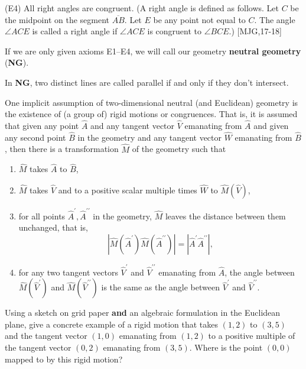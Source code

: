 \begin{axiom}
(E4) All right angles are congruent. (A right angle is defined as
follows. Let $C$ be the midpoint on the segment $\overline{AB}$. Let
$E$ be any point not equal to $C$. The angle $\angle ACE$ is called a
right angle if $\angle ACE$ is congruent to $\angle BCE$.) [MJG,17-18]
\end{axiom}

\begin{definition}
If we are only given axioms E1--E4, we will call our
geometry \textbf{neutral geometry} (\textbf{NG}).
\end{definition}

\begin{definition}
In \textbf{NG}, two distinct lines are called parallel if and only if they
don't intersect.
\end{definition}

One implicit assumption of two-dimensional neutral (and Euclidean)
geometry is the existence of (a group of) rigid motions or
congruences. That is, it is assumed that given any point $\hat{A}$ and
any tangent vector $\hat{V}$ emanating from $\hat{A}$ and given any
second point $\hat{B}$ in the geometry and any tangent vector
$\hat{W}$ emanating from $\hat{B}$, then there is a transformation
$\hat{M}$ of the geometry such that
\begin{enumerate}
\item $\hat{M}$ takes $\hat{A}$ to $\hat{B}$,
\item $\hat{M}$ takes $\hat{V}$ and to a positive scalar multiple times $\hat{W}$ to $\hat{M}\left( \hat{V}\right) $,
\item for all points $\hat{A}^{\prime},\hat{A}^{\prime\prime}$ in the
geometry, $\hat{M}$ leaves the distance between them unchanged, that
is,
\[
\left\vert \hat{M}\left(  \hat{A}^{\prime}\right)  \hat{M}\left(  \hat
{A}^{\prime\prime}\right) \right\vert =\left\vert \hat{A}^{\prime}\hat
{A}^{\prime\prime}\right\vert ,
\]
\item for any two tangent vectors $\hat{V}^{\prime}$ and
$\hat{V}^{\prime\prime}$ emanating from $\hat{A}$, the angle between
$\hat{M}\left( \hat{V}^{\prime }\right) $ and
$\hat{M}\left( \hat{V}^{\prime\prime}\right) $ is the same as the
angle between $\hat{V}^{\prime}$ and $\hat{V}^{\prime\prime}$.
\end{enumerate}


\begin{exercise}
Using a sketch on grid paper \textbf{and} an algebraic formulation in
the Euclidean plane, give a concrete example of a rigid motion that
takes $\left( 1,2\right) $ to $\left( 3,5\right) $ and the tangent
vector $\left( 1,0\right) $ emanating from $\left( 1,2\right) $ to a
positive multiple of the tangent vector $\left( 0,2\right) $ emanating
from $\left( 3,5\right)$. Where is the point $(0,0)$ mapped to by this
rigid motion?
\end{exercise}

